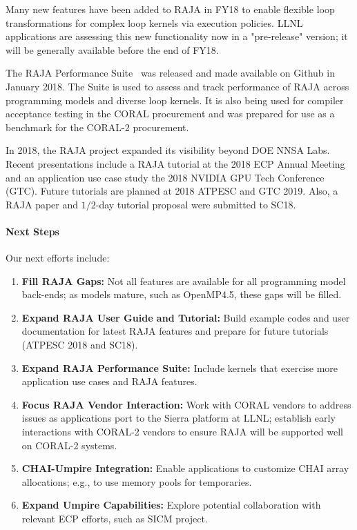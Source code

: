 Many new features have been added to RAJA in FY18 to enable flexible
loop transformations for complex loop kernels via execution policies.
LLNL applications are assessing this new functionality now in a 
"pre-release" version; it will be generally available before the end of FY18.

The RAJA Performance Suite~\cite{RAJAPerf-github} was released and made 
available on Github in January 2018. The Suite is used to assess and track 
performance of RAJA across programming models and diverse loop 
kernels. It is also being used for compiler acceptance testing in the CORAL 
procurement and was prepared for use as a benchmark for the CORAL-2 procurement.

In 2018, the RAJA project expanded its visibility beyond DOE NNSA Labs. 
Recent presentations include a RAJA tutorial at the 2018 ECP Annual Meeting 
and an application use case study the 2018 NVIDIA GPU Tech Conference (GTC). 
Future tutorials are planned at 2018 ATPESC and GTC 2019. Also, a RAJA paper 
and $1/2$-day tutorial proposal were submitted to SC18.

\paragraph{Next Steps}

Our next efforts include:
\begin{enumerate}
\item {\bf Fill RAJA Gaps:} Not all features are available for all programming model back-ends; as models mature, such as OpenMP4.5, these gaps will be filled.
\item {\bf Expand RAJA User Guide and Tutorial:} Build example codes and user documentation for latest RAJA features and prepare for future tutorials (ATPESC 2018 and SC18).
\item {\bf Expand RAJA Performance Suite:} Include kernels that exercise more application use cases and RAJA features.
\item {\bf Focus RAJA Vendor Interaction:} Work with CORAL vendors to address issues as applications port to the Sierra platform at LLNL; establish early interactions with CORAL-2 vendors to ensure RAJA will be supported well on CORAL-2 systems.
\item {\bf CHAI-Umpire Integration:} Enable applications to customize CHAI array allocations; e.g., to use memory pools for temporaries.
\item {\bf Expand Umpire Capabilities:} Explore potential collaboration with relevant ECP efforts, such as SICM project.
\end{enumerate}
